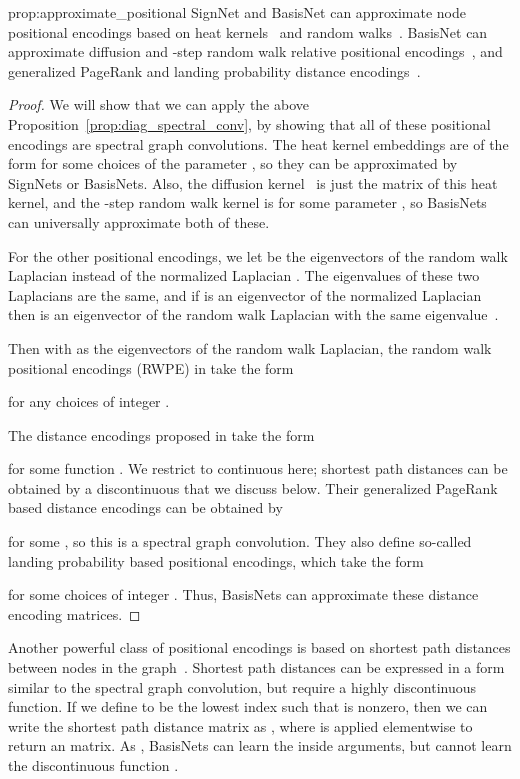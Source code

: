 \documentclass{article} \usepackage{iclr2023_conference,times}
\begin{document}
\begin{repproposition}{prop:approximate_positional}
    SignNet and BasisNet can approximate node positional encodings based on heat kernels~\citep{feldman2022weisfeiler} and random walks~\citep{dwivedi2022graph}. BasisNet can approximate diffusion and -step random walk relative positional encodings~\citep{mialon2021graphit}, and generalized PageRank and landing probability distance encodings~\citep{li2020distance}.
\end{repproposition}
\begin{proof}
    We will show that we can apply the above Proposition~\ref{prop:diag_spectral_conv}, by showing that all of these positional encodings are spectral graph convolutions. The heat kernel embeddings are of the form  for some choices of the parameter , so they can be approximated by SignNets or BasisNets. Also, the diffusion kernel~\citep{mialon2021graphit} is just the matrix of this heat kernel, and the -step random walk kernel is  for some parameter , so BasisNets can universally approximate both of these.

    For the other positional encodings, we let  be the eigenvectors of the random walk Laplacian  instead of the normalized Laplacian . The eigenvalues of these two Laplacians are the same, and if  is an eigenvector of the normalized Laplacian then  is an eigenvector of the random walk Laplacian with the same eigenvalue~\citep{von2007tutorial}.

    Then with  as the eigenvectors of the random walk Laplacian, the random walk positional encodings (RWPE) in \cite{dwivedi2022graph} take the form 
    
    for any choices of integer .

    The distance encodings proposed in \cite{li2020distance} take the form
    
    for some function . We restrict to continuous  here; shortest path distances can be obtained by a discontinuous  that we discuss below. Their generalized PageRank based distance encodings can be obtained by 
    
    for some , so this is a spectral graph convolution. They also define so-called landing probability based positional encodings, which take the form
    
    for some choices of integer . Thus, BasisNets can approximate these distance encoding matrices. 
\end{proof}
Another powerful class of positional encodings is based on shortest path distances between nodes in the graph~\citep{ying2021transformers,li2020distance}. Shortest path distances can be expressed in a form similar to the spectral graph convolution, but require a highly discontinuous function. If we define  to be the lowest index such that  is nonzero, then we can write the shortest path distance matrix as , where  is applied elementwise to return an  matrix. As , BasisNets can learn the inside arguments, but cannot learn the discontinuous function .
\end{document}
